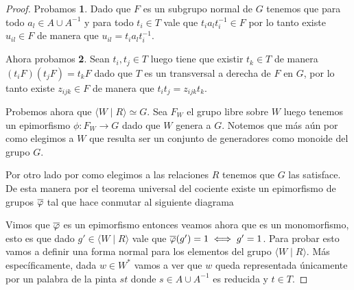 \documentclass[tesis.tex]{subfiles}
\begin{document}
	
	\begin{proof}
		Probamos \textbf{1}.
		Dado que $F$ es un subgrupo normal de $G$ tenemos que para todo $a_{l} \in A \cup A^{-1}$ y para todo $t_{i} \in T$ vale que $t_{i}a_{l}t_{i}^{-1} \in F$ por lo tanto existe $u_{il} \in F$ de manera que $u_{il} = t_{i}a_{l}t_{i}^{-1}$.

		Ahora probamos \textbf{2}.
		Sean $t_{i},t_{j} \in T$ luego tiene que existir $t_{k} \in T$ de manera $(t_{i}F)(t_{j}F) = t_{k} F$ dado que $T$ es un transversal a derecha de $F$ en $G$, por lo tanto existe $z_{ijk} \in F$ de manera que $t_{i}t_{j} = z_{ijk}t_{k}$.

		Probemos ahora que $\langle W \mid R \rangle \simeq G$.
		Sea $F_{W}$ el grupo libre sobre $W$ luego tenemos un epimorfismo $\phi:F_{W} \to G$ dado que $W$ genera a $G$.
		Notemos que más aún por como elegimos a $W$ que resulta ser un conjunto de generadores como monoide del grupo $G$. 

		Por otro lado por como elegimos a las relaciones $R$ tenemos que $G$ las satisface.
		De esta manera por el teorema universal del cociente existe un epimorfismo de grupos $\overline \varphi$ tal que hace conmutar al siguiente diagrama	
		\begin{center}
		\end{center}
		
		Vimos que $\overline \varphi$ es un epimorfismo entonces veamos ahora que es un monomorfismo, esto es que dado $g' \in \langle W \mid R \rangle$ vale que $\overline{\varphi}(g') = 1 \iff g' = 1$.
		Para probar esto vamos a definir una forma normal para los elementos del grupo $\langle W \mid R \rangle$.
		Más específicamente, dada $w \in W^{*}$ vamos a ver que $w$ queda representada únicamente por un palabra de la pinta $st$ donde $s \in A \cup A^{-1}$ es reducida y $t \in T$. 
		


\end{proof}
\end{document}
